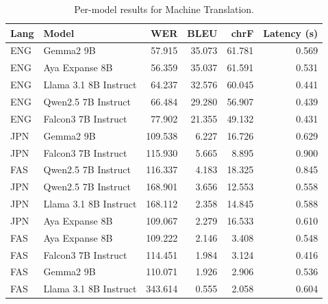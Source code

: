 \begin{table}[t]
\centering
\caption{Per-model results for Machine Translation.}
\label{tab:appendix-machine-translation-analysis}
\begin{tabular}{llrrrr}
\toprule
Lang & Model & WER & BLEU & chrF & Latency (s) \\
\midrule
ENG & Gemma2 9B & 57.915 & 35.073 & 61.781 & 0.569 \\
ENG & Aya Expanse 8B & 56.359 & 35.037 & 61.591 & 0.531 \\
ENG & Llama 3.1 8B Instruct & 64.237 & 32.576 & 60.045 & 0.441 \\
ENG & Qwen2.5 7B Instruct & 66.484 & 29.280 & 56.907 & 0.439 \\
ENG & Falcon3 7B Instruct & 77.902 & 21.355 & 49.132 & 0.431 \\
JPN & Gemma2 9B & 109.538 & 6.227 & 16.726 & 0.629 \\
JPN & Falcon3 7B Instruct & 115.930 & 5.665 & 8.895 & 0.900 \\
FAS & Qwen2.5 7B Instruct & 116.337 & 4.183 & 18.325 & 0.845 \\
JPN & Qwen2.5 7B Instruct & 168.901 & 3.656 & 12.553 & 0.558 \\
JPN & Llama 3.1 8B Instruct & 168.112 & 2.358 & 14.845 & 0.588 \\
JPN & Aya Expanse 8B & 109.067 & 2.279 & 16.533 & 0.610 \\
FAS & Aya Expanse 8B & 109.222 & 2.146 & 3.408 & 0.548 \\
FAS & Falcon3 7B Instruct & 114.451 & 1.984 & 3.124 & 0.416 \\
FAS & Gemma2 9B & 110.071 & 1.926 & 2.906 & 0.536 \\
FAS & Llama 3.1 8B Instruct & 343.614 & 0.555 & 2.058 & 0.604 \\
\bottomrule
\end{tabular}
\end{table}
